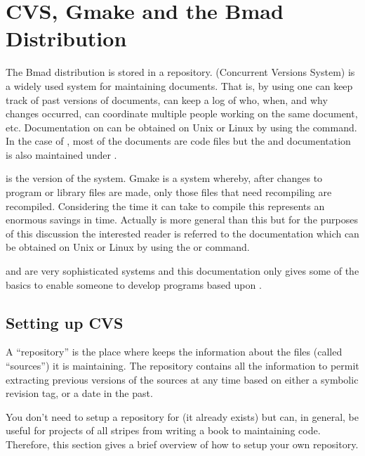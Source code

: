 \chapter{CVS, Gmake and the Bmad Distribution}
\label{c:cvs_gmake}

The Bmad distribution is stored in a \cvs repository. \cvs
(Concurrent Versions System) is a widely used system for maintaining
documents. That is, by using \cvs one can keep track of past
versions of documents, can keep a log of who, when, and why changes
occurred, can coordinate multiple people working on the same document,
etc.  Documentation on \cvs can be obtained on Unix or Linux by
using the  command. In the case of \bmad, most of the
documents are code files but the \bmad and \tao documentation is
also maintained under \cvs.

 is the  version of the  system. Gmake is a
system whereby, after changes to program or library files are made,
only those files that need recompiling are recompiled. Considering the
time it can take to compile this represents an enormous savings in
time. Actually  is more general than this but for the
purposes of this discussion the interested reader is referred to the
 documentation which can be obtained on Unix or Linux by
using the  or  command.

\cvs and  are very sophisticated systems and this
documentation only gives some of the basics to enable someone to
develop programs based upon \bmad.

\section{Setting up CVS}
\label{s:cvs_setup}

A ``repository'' is the place where \cvs keeps the information
about the files (called ``sources'') it is maintaining. The repository
contains all the information to permit extracting previous versions of
the sources at any time based on either a symbolic revision tag, or a
date in the past.

You don't need to setup a \cvs repository for \bmad (it already
exists) but \cvs can, in general, be useful for projects of all
stripes from writing a book to maintaining code. Therefore, this
section gives a brief overview of how to setup your own \cvs
repository.

